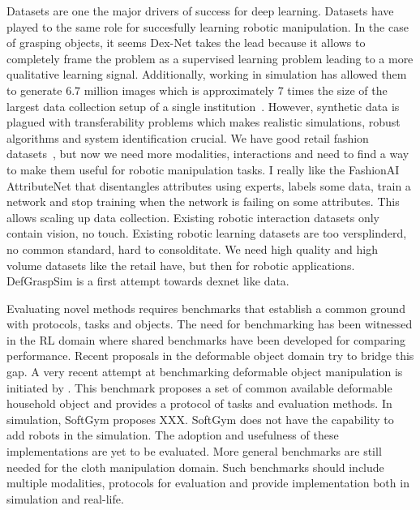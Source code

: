 \documentclass[\home/main.tex]{subfiles}
\begin{document}
Datasets are one the major drivers of success for deep learning. Datasets have played to the same role for succesfully learning robotic manipulation. In the case of grasping objects, it seems Dex-Net takes the lead because it allows to completely frame the problem as a supervised learning problem leading to a more qualitative learning signal. Additionally, working in simulation has allowed them to generate $6.7$ million images which is approximately $7$ times the size of the largest data collection setup of a single institution~\autocite{Levine2016}. However, synthetic data is plagued with transferability problems which makes realistic simulations, robust algorithms and system identification crucial. 
We have good retail fashion datasets~\autocite{DeepFashion, DeepFashion2, FashionAI}, but now we need more modalities, interactions and need to find a way to make them useful for robotic manipulation tasks. 
I really like the FashionAI AttributeNet that disentangles attributes using experts, labels some data, train a network and stop training when the network is failing on some attributes. This allows scaling up data collection.
Existing robotic interaction datasets only contain vision, no touch. 
Existing robotic learning datasets are too versplinderd, no common standard, hard to consolditate. 
We need high quality and high volume datasets like the retail have, but then for robotic applications. 
DefGraspSim is a first attempt towards dexnet like data.



Evaluating novel methods requires benchmarks that establish a common ground with protocols, tasks and objects. The need for benchmarking has been witnessed in the RL domain where shared benchmarks have been developed \autocite{brockman2016openai} for comparing performance. Recent proposals in the deformable object domain try to bridge this gap. A very recent attempt at benchmarking deformable object manipulation is initiated by \autocite{garciacamacho2021household}. This benchmark proposes a set of common available deformable household object and provides a protocol of tasks and evaluation methods. In simulation, SoftGym proposes XXX. SoftGym does not have the capability to add robots in the simulation. 
The adoption and usefulness of these implementations are yet to be evaluated. More general benchmarks are still needed for the cloth manipulation domain. Such benchmarks should include multiple modalities, protocols for evaluation and provide implementation both in simulation and real-life. 
\end{document}
